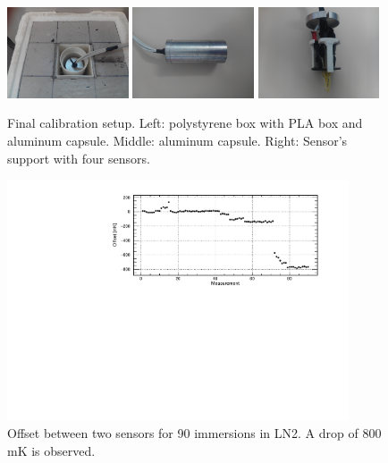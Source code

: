 \begin{figure}[htbp]
\centering
\includegraphics[width=0.32\textwidth]{images/figure_4_a.jpg}
\includegraphics[width=0.32\textwidth]{images/figure_4_b.jpg}
\includegraphics[width=0.32\textwidth]{images/figure_4_c.jpg}
\caption{Final calibration setup. Left: polystyrene box with PLA box and aluminum capsule. Middle: aluminum capsule. Right: Sensor's support with four sensors. 
\label{fig:setup_final}}
\end{figure}

\begin{figure}[htbp]
\centering
\includegraphics[width=0.9\textwidth]{images/figure_5.pdf}
\caption{Offset between two sensors for 90 immersions in LN2. A drop of 800 mK is observed. 
\label{fig:broken_sensor_evolution}}
\end{figure}

